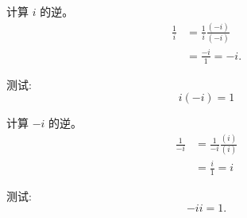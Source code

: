 \begin{example}
    计算 $i$ 的逆。
    $$
    \begin{aligned}
    \frac{1}{i} & =\frac{1}{i} \frac{(-i)}{(-i)} \\
    & =\frac{-i}{1}=-i .
    \end{aligned}
    $$
    
    测试:
    $$
    i(-i)=1
    $$
\end{example}

\begin{example}
    计算 $-i$ 的逆。
    $$
    \begin{aligned}
    \frac{1}{-i} & =\frac{1}{-i} \frac{(i)}{(i)} \\
    & =\frac{i}{1}=i
    \end{aligned}
    $$
    
    测试:
    $$
    -i i=1 .
    $$
\end{example}
